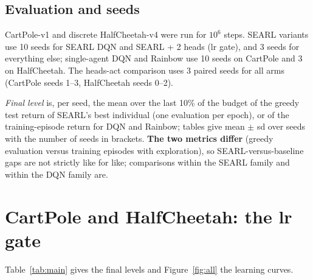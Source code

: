 \documentclass[11pt]{article}
\begin{document}
\subsection{Evaluation and seeds}
CartPole-v1 and discrete HalfCheetah-v4 were run for $10^6$ steps. SEARL variants use 10 seeds for
SEARL DQN and SEARL + 2 heads (lr gate), and 3 seeds for everything else; single-agent DQN and Rainbow use 10 seeds on
CartPole and 3 on HalfCheetah. The heads-act comparison uses 3 paired seeds for all arms (CartPole seeds 1--3,
HalfCheetah seeds 0--2).

\emph{Final level} is, per seed, the mean over the last 10\% of the budget of the greedy test return of SEARL's best
individual (one evaluation per epoch), or of the training-episode return for DQN and Rainbow; tables give mean $\pm$ sd
over seeds with the number of seeds in brackets. \textbf{The two metrics differ} (greedy evaluation versus training
episodes with exploration), so SEARL-versus-baseline gaps are not strictly like for like; comparisons within the SEARL
family and within the DQN family are.

\section{CartPole and HalfCheetah: the lr gate}
Table~\ref{tab:main} gives the final levels and Figure~\ref{fig:all} the learning curves.

\begin{table}[h]
\centering\small

\caption{Final level, $10^6$ steps (mean $\pm$ sd over seeds, seeds in brackets).}
\label{tab:main}
\end{table}

\begin{table}[h]
\centering\small

\caption{SEARL + 2 heads (lr gate) minus SEARL DQN, 10 paired seeds.}
\label{tab:paired}
\end{table}
\end{document}
